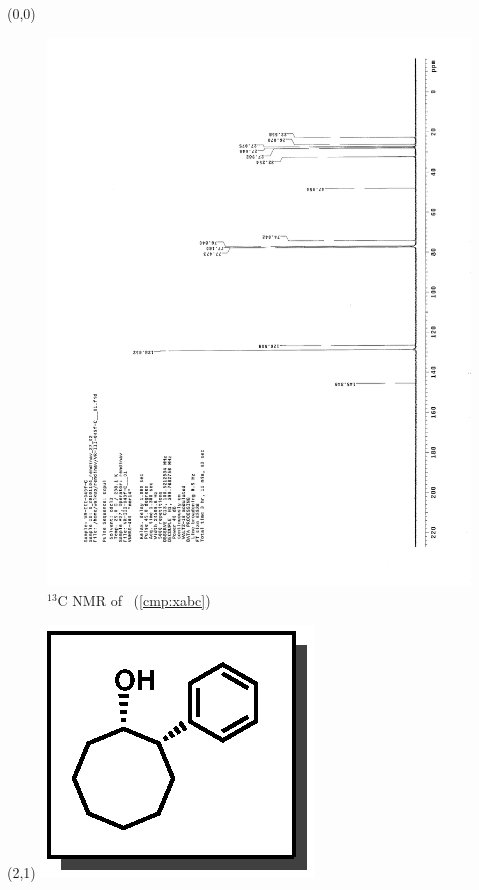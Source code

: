 \clearpage
\begin{textblock}{20}(0,0)
\begin{figure}[htb]
\caption{$^{13}$C NMR of  \CMPxaba\ (\ref{cmp:xabc})}
\includegraphics[scale=0.75, trim = 0mm 0mm 0mm 5mm,
clip]{chp_asymmetric/images/nmr/xabaC}
\vspace{-100pt}
\end{figure}
\end{textblock}
\begin{textblock}{1}(2,1)
\includegraphics[scale=0.8, angle=90]{chp_asymmetric/images/xaba}
\end{textblock}
\clearpage

